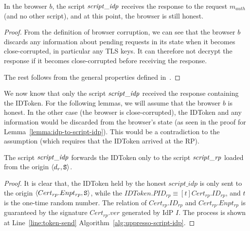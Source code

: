   \begin{lemma} \label{lemma:idp-to-script-idp} %
    In the browser $b$, the script $\mathit{script\_idp}$ receives 
    the response to the request $m_{auth}$ (and no other script), 
    and at this point, the browser is still honest.
  \end{lemma}
  \begin{proof}
    From the definition of browser corruption, we can see that 
    the browser $b$ discards any information about pending 
    requests in its state when it becomes close-corrupted, in 
    particular any TLS keys. It can therefore not decrypt the 
    response if it becomes close-corrupted before receiving the 
    response.
  
    The rest follows from the general properties defined
    in~\cite{BrowserID}.
  \end{proof}
  
  We now know that only the script $\mathit{script\_idp}$ received 
  the response containing the IDToken. For the following lemmas, 
  we will assume that the browser $b$ is honest. In the other 
  case (the browser is close-corrupted), the IDToken and any 
  information would be discarded from the browser's state 
  (as seen in the proof for Lemma~\ref{lemma:idp-to-script-idp}). 
  This would be a contradiction to the assumption 
  (which requires that the IDToken arrived at the RP).
  
  
  \begin{lemma}\label{lemma:script-idp-to-script-rp} %
    The script $\mathit{script\_idp}$ forwards the IDToken only to 
    the script $\mathit{script\_rp}$ loaded from the origin 
    $\langle d_r, \mathtt{S}\rangle$.
  \end{lemma}
  \begin{proof}
    It is clear that, the IDToken held by the honest 
    $script\_idp$ is only sent to the origin 
    $\langle Cert_{rp}.Enpt_{rp}, \mathtt{S}\rangle$, 
    while the $IDToken.PID_{rp} \equiv [t]Cert_{rp}.ID_{rp}$, 
    and $t$ is the one-time random number. The relation of 
    $Cert_{rp}.ID_{rp}$ and $Cert_{rp}.Enpt_{rp}$ is guaranteed 
    by the signature $Cert_{rp}.ver$ generated by IdP $I$. 
    The process is shown at Line~\ref{line:token-send}
    Algorithm~\ref{alg:uppresso-script-idp}.
  \end{proof}
  
